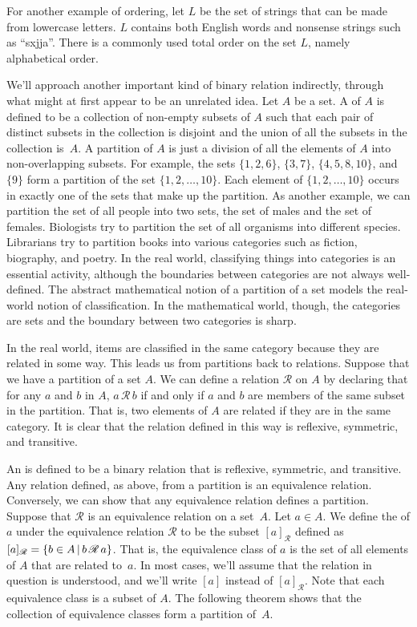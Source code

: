 For another example of ordering, let $L$ be the set of strings
that can be made from lowercase letters.  $L$ contains both
English words and nonsense strings such as ``sxjja''.  There is
a commonly used total order on the set $L$, namely alphabetical
order.

\medskip

We'll approach another important kind of binary relation indirectly,
through what might at first appear to be an unrelated idea.
Let $A$ be a set.  A  of $A$ is defined to
be a collection of non-empty subsets of $A$ such that each pair of distinct
subsets in the collection is disjoint and the union of all the subsets
in the collection is~$A$.  A partition of $A$ is just a division
of all the elements of $A$ into non-overlapping subsets.
For example, the sets $\{1,2,6\}$, $\{3,7\}$, $\{4,5,8,10\}$,
and $\{9\}$ form a partition of the set $\{1,2,\dots,10\}$.  
Each element of $\{1,2,\dots,10\}$ occurs in exactly one
of the sets that make up the partition.  As another example,
we can partition the set of all people into two sets,
the set of males and the set of females.  Biologists try to
partition the set of all organisms into different species.
Librarians try to partition books into various categories such
as fiction, biography, and poetry.  
In the real world, classifying things into categories is an essential
activity, although the boundaries between categories are not
always well-defined.  The abstract mathematical notion of
a partition of a set models the real-world notion of classification.
In the mathematical world, though, the categories are sets
and the boundary between two categories is sharp.

In the real world, items are classified in the same category
because they are related in some way.  This leads us from
partitions back to relations.  Suppose that we have a partition of
a set $A$.  We can define a relation $\mathscr R$ on $A$ by
declaring that for any $a$ and $b$ in $A$, $a\,{\mathscr R}\,b$
if and only if $a$ and $b$ are members of the same subset in the
partition.  That is, two elements of $A$ are related if they
are in the same category.  It is clear that the relation defined
in this way is reflexive, symmetric, and transitive.

An  is defined to be a binary relation
that is reflexive, symmetric, and transitive.  Any relation defined,
as above, from a partition is an equivalence relation.  Conversely,
we can show that any equivalence relation defines a partition.
Suppose that $\mathscr R$ is an equivalence relation on a set~$A$.
Let $a\in A$.  We define the  of $a$
under the equivalence relation $\mathscr R$ to be the subset
$[a]_{\mathscr R}$ defined as $[a]_{\mathscr R}=\{b\in A\,|\, b\,{\mathscr R}\,a\}$.
That is, the equivalence class of $a$ is the set of all elements of
$A$ that are related to~$a$.  In most cases, we'll assume that the
relation in question is understood, and we'll write $[a]$
instead of $[a]_{\mathscr R}$.  Note that each equivalence
class is a subset of $A$.  The following theorem shows that the
collection of equivalence classes form a partition of~$A$.

